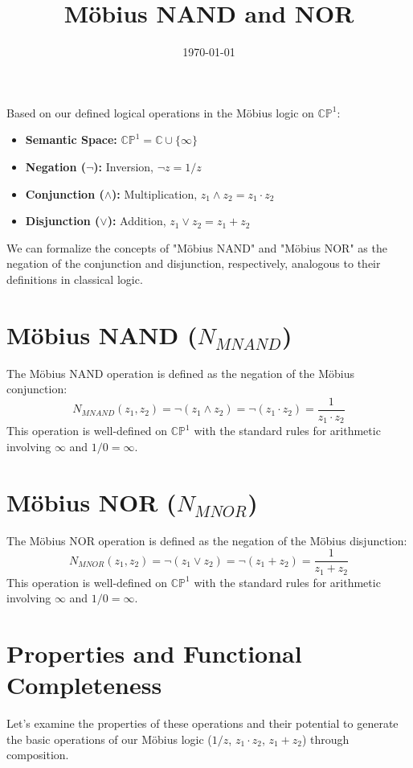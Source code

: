 \documentclass{article}
\title{Möbius NAND and NOR}
\author{}
\date{\today}
\begin{document}
	\maketitle

	Based on our defined logical operations in the M\"{o}bius logic on $\mathbb{CP}^1$:
	\begin{itemize}
		\item \textbf{Semantic Space:} $\mathbb{CP}^1 = \mathbb{C} \cup \{\infty\}$
		\item \textbf{Negation ($\neg$):} Inversion, $\neg z = 1/z$
		\item \textbf{Conjunction ($\wedge$):} Multiplication, $z_1 \wedge z_2 = z_1 \cdot z_2$
		\item \textbf{Disjunction ($\vee$):} Addition, $z_1 \vee z_2 = z_1 + z_2$
	\end{itemize}
	We can formalize the concepts of "M\"{o}bius NAND" and "M\"{o}bius NOR" as the negation of the conjunction and disjunction, respectively, analogous to their definitions in classical logic.

	\section{Möbius NAND ($N_{MNAND}$)}

	The M\"{o}bius NAND operation is defined as the negation of the M\"{o}bius conjunction:
	$$N_{MNAND}(z_1, z_2) = \neg(z_1 \wedge z_2) = \neg(z_1 \cdot z_2) = \frac{1}{z_1 \cdot z_2}$$
	This operation is well-defined on $\mathbb{CP}^1$ with the standard rules for arithmetic involving $\infty$ and $1/0 = \infty$.

	\section{Möbius NOR ($N_{MNOR}$)}

	The M\"{o}bius NOR operation is defined as the negation of the M\"{o}bius disjunction:
	$$N_{MNOR}(z_1, z_2) = \neg(z_1 \vee z_2) = \neg(z_1 + z_2) = \frac{1}{z_1 + z_2}$$
	This operation is well-defined on $\mathbb{CP}^1$ with the standard rules for arithmetic involving $\infty$ and $1/0 = \infty$.

	\section{Properties and Functional Completeness}

	Let's examine the properties of these operations and their potential to generate the basic operations of our M\"{o}bius logic ($1/z$, $z_1 \cdot z_2$, $z_1 + z_2$) through composition.
\end{document}
